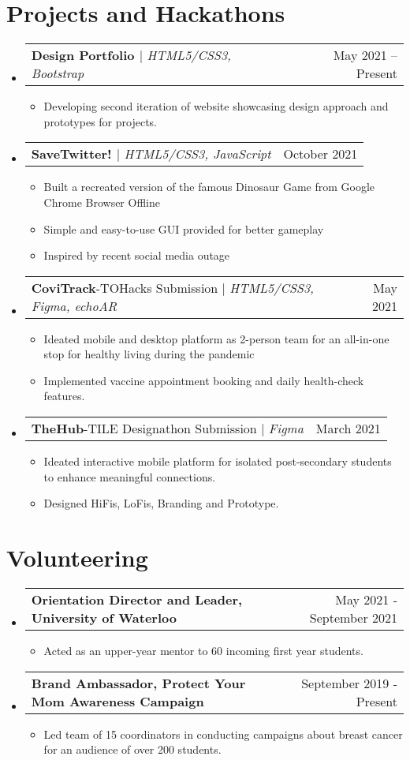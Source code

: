 \documentclass[letterpaper,11pt]{article}
\makeatletter
\newcommand{\resumeItem}[1]{
  \item\small{
    {#1 \vspace{-2pt}}
  }
}
\newcommand{\resumeProjectHeading}[2]{
    \item
    \begin{tabular*}{0.97\textwidth}{l@{\extracolsep{\fill}}r}
      \small#1 & #2 \\
    \end{tabular*}\vspace{-7pt}
}
\newcommand{\resumeSubHeadingListStart}{\begin{itemize}[leftmargin=0.15in, label={}]}
\newcommand{\resumeSubHeadingListEnd}{\end{itemize}}
\newcommand{\resumeItemListStart}{\begin{itemize}}
\newcommand{\resumeItemListEnd}{\end{itemize}\vspace{-5pt}}
\makeatother
\begin{document}
\section{Projects and Hackathons}
    \resumeSubHeadingListStart
      \resumeProjectHeading
          {\textbf{Design Portfolio {\href{https://github.com/NandiniMeh/design_portfolio_iteration01}{\faGithub}}} $|$ \emph{HTML5/CSS3, Bootstrap} }{May 2021 -- Present}
          \resumeItemListStart
            \resumeItem{Developing second iteration of website showcasing design approach and prototypes for projects.}
          \resumeItemListEnd
      \resumeProjectHeading
          {\textbf{SaveTwitter! {\href{https://github.com/NandiniMeh/save-twitter-game}{\faGithub}}} $|$ \emph{HTML5/CSS3, JavaScript}}{October 2021}
          \resumeItemListStart
            \resumeItem{Built a recreated version of the famous Dinosaur Game from Google Chrome Browser Offline}
            \resumeItem{Simple and easy-to-use GUI provided for better gameplay}
            \resumeItem{Inspired by recent social media outage}
          \resumeItemListEnd
     \resumeProjectHeading
          {\textbf{CoviTrack}-TOHacks Submission {\href{https://github.com/NandiniMeh/CoviTrack}{\faGithub}} $|$ \emph{HTML5/CSS3, Figma, echoAR}}{May 2021}
          \resumeItemListStart
            \resumeItem{Ideated mobile and desktop platform as 2-person team for an all-in-one stop for healthy living during the pandemic}
            \resumeItem{Implemented vaccine appointment booking and daily health-check features.}
          \resumeItemListEnd
     \resumeProjectHeading
          {\textbf{TheHub}-TILE Designathon Submission {\href{https://github.com/NandiniMeh/TheHub}{\faGithub}} $|$ \emph{Figma}}{March 2021}
          \resumeItemListStart
            \resumeItem{Ideated interactive mobile platform for isolated post-secondary students to enhance meaningful connections.}
            \resumeItem{Designed HiFis, LoFis, Branding and Prototype.}
          \resumeItemListEnd
    \resumeSubHeadingListEnd

\section{Volunteering}
  \resumeSubHeadingListStart
    \resumeProjectHeading
      {\textbf {Orientation Director and Leader, University of Waterloo}}{May 2021 - September 2021}
      \resumeItemListStart
            \resumeItem{Acted as an upper-year mentor to 60 incoming first year students.}
          \resumeItemListEnd
    \resumeProjectHeading
      {\textbf {Brand Ambassador, Protect Your Mom Awareness Campaign}}{September 2019 - Present}
      \resumeItemListStart
            \resumeItem{Led team of 15 coordinators in conducting campaigns about breast cancer for an audience of over 200 students.}
          \resumeItemListEnd
  \resumeSubHeadingListEnd
\end{document}
